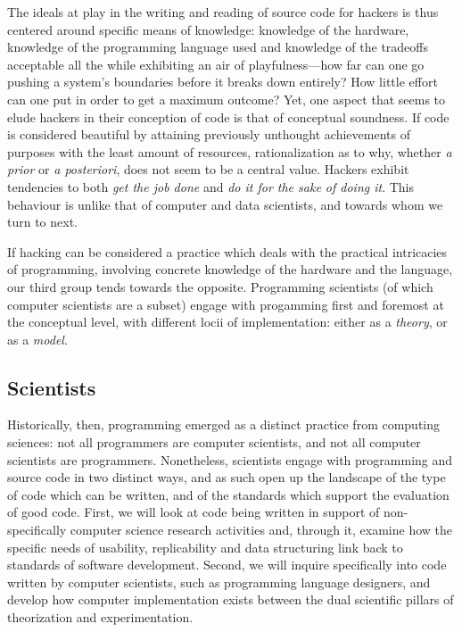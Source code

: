 The ideals at play in the writing and reading of source code for hackers is thus centered around specific means of knowledge: knowledge of the hardware, knowledge of the programming language used and knowledge of the tradeoffs acceptable all the while exhibiting an air of playfulness—how far can one go pushing a system's boundaries before it breaks down entirely? How little effort can one put in order to get a maximum outcome? Yet, one aspect that seems to elude hackers in their conception of code is that of conceptual soundness. If code is considered beautiful by attaining previously unthought achievements of purposes with the least amount of resources, rationalization as to why, whether \emph{a prior} or \emph{a posteriori}, does not seem to be a central value. Hackers exhibit tendencies to both \emph{get the job done} and \emph{do it for the sake of doing it}. This behaviour is unlike that of computer and data scientists, and towards whom we turn to next.

\vspace*{2\baselineskip}

If hacking can be considered a practice which deals with the practical intricacies of programming, involving concrete knowledge of the hardware and the language, our third group tends towards the opposite. Programming scientists (of which computer scientists are a subset) engage with progamming first and foremost at the conceptual level, with different locii of implementation: either as a \emph{theory}, or as a \emph{model}.

\subsection{Scientists}

Historically, then, programming emerged as a distinct practice from computing sciences: not all programmers are computer scientists, and not all computer scientists are programmers. Nonetheless, scientists engage with programming and source code in two distinct ways, and as such open up the landscape of the type of code which can be written, and of the standards which support the evaluation of good code. First, we will look at code being written in support of non-specifically computer science research activities and, through it, examine how the specific needs of usability, replicability and data structuring link back to standards of software development. Second, we will inquire specifically into code written by computer scientists, such as programming language designers, and develop how computer implementation exists between the dual scientific pillars of theorization and experimentation\cite{vardi_science_2010}.

